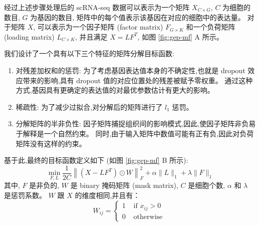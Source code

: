 经过上述步骤处理后的 scRNA-seq 数据可以表示为一个矩阵 $X_{C \times G}$, $C$ 为细胞的数目, $G$ 为基因的数目, 
矩阵中的每个值表示该基因在对应的细胞中的表达量。
对于矩阵 $X$, 可以表示为一个因子矩阵 (factor matrix) $F_{G \times K}$ 和一个负荷矩阵 (loading matrix) $L_{C \times K}$,
并且满足 $X=LF^T$, 如图 \ref{fig:gep-mf} A 所示。 

我们设计了一个具有以下三个特征的矩阵分解目标函数:
\begin{enumerate}
    \item 对残差加权和的惩罚: 为了考虑基因表达值本身的不确定性,也就是 dropout 效应带来的影响,具有 dropout 值的对应位置处的残差被赋予零权重。
          通过这种方式,基因具有更确定的表达值的对最优参数估计有更大的影响。
    \item 稀疏性: 为了减少过拟合,对分解后的矩阵进行了 $l_1$ 惩罚。
    \item 分解矩阵的半非负性: 因子矩阵捕捉组织间的影响模式,因此,使因子矩阵非负易于解释是一个自然约束。
          同时,由于输入矩阵中数值可能有正有负,因此对负荷矩阵没有这样的约束。
\end{enumerate}
基于此,最终的目标函数定义如下 (如图 \ref{fig:gep-mf} B 所示):
\begin{equation}
    \label{eq:obj}
    \min _{F, L} \frac{1}{2 C}\left\|\left(X-L F^{T}\right) \odot W\right\|_{F}^{2}+\alpha\|L\|_{1}+\lambda\|F\|_{1}
\end{equation}
其中, $F$ 是非负的, $W$ 是 binary 掩码矩阵 (mask matrix), $C$ 是细胞个数,
 $\alpha$ 和 $\lambda$ 是惩罚系数。
$W$ 跟 $X$ 的维度相同,并且有：
\begin{equation}
    W_{i j}=\left\{\begin{array}{ll}1 & \text { if } x_{i j}>0 \\ 0 & \text { otherwise }\end{array}\right.
\end{equation}

